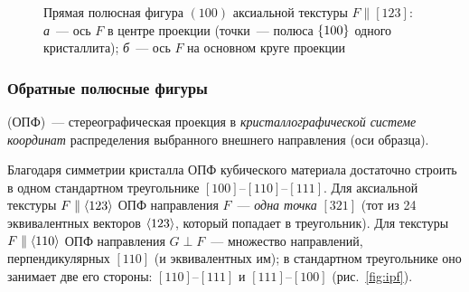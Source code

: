 \begin{figure}[ht]
\centering
{}
\caption{Прямая полюсная фигура $(100)$ аксиальной текстуры
$F\parallel[123]$: \textit{а}~— ось $F$ в центре проекции (точки~—
полюса $\{100\}$ одного кристаллита); \textit{б}~— ось $F$ на основном
круге проекции}
\label{fig:pf123}
\end{figure}

\subsubsection{Обратные полюсные фигуры}
\begin{opredelenie}
 (ОПФ)~— стереографическая проекция в
\emph{кристаллографической системе координат} распределения выбранного
внешнего направления (оси образца).
\end{opredelenie}

Благодаря симметрии кристалла ОПФ кубического материала достаточно
строить в одном стандартном треугольнике $[100]$--$[110]$--$[111]$.
Для аксиальной текстуры $F\parallel\langle 123\rangle$ ОПФ направления $F$~—
\emph{одна точка} $[321]$ (тот из 24 эквивалентных векторов
$\langle 123\rangle$, который попадает в треугольник). Для текстуры
$F\parallel\langle 110\rangle$ ОПФ направления $G\perp F$~— множество направлений,
перпендикулярных $[110]$ (и эквивалентных им); в стандартном треугольнике
оно занимает две его стороны: $[110]$--$[111]$ и $[111]$--$[100]$
(рис.~\ref{fig:ipf}).

